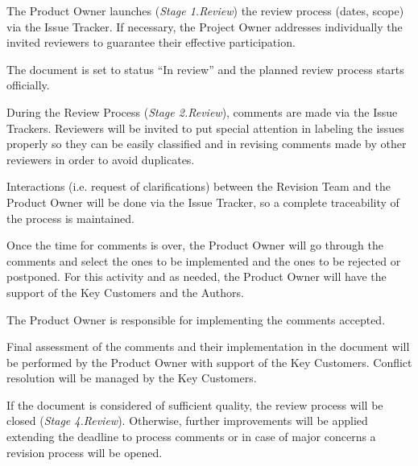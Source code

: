 \documentclass{template/openetcs_article}
\begin{document}
The Product Owner launches ({\it Stage 1.Review}) the review process (dates, scope) via the Issue Tracker. If necessary, the Project Owner addresses individually the invited reviewers to guarantee their effective participation.

The document is set to status “In review” and the planned review process starts officially.

During the Review Process ({\it Stage 2.Review}), comments are made via the Issue Trackers. Reviewers will be invited to put special attention in labeling the issues properly so they can be easily classified and in revising comments made by other reviewers in order to avoid duplicates.

Interactions (i.e. request of clarifications) between the Revision Team and the Product Owner will be done via the Issue Tracker, so a complete traceability of the process is maintained.

Once the time for comments is over, the Product Owner will go through the comments and select the ones to be implemented and the ones to be rejected or postponed. For this activity and as needed, the Product Owner will have the support of the Key Customers and the Authors.

The Product Owner is responsible for implementing the comments accepted.

Final assessment of the comments and their implementation in the document will be performed by the Product Owner with support of the Key Customers. Conflict resolution will be managed by the Key Customers.

If the document is considered of sufficient quality, the review process will be closed ({\it Stage 4.Review}). Otherwise, further improvements will be applied extending the deadline to process comments or in case of major concerns a revision process will be opened. 
\end{document}
